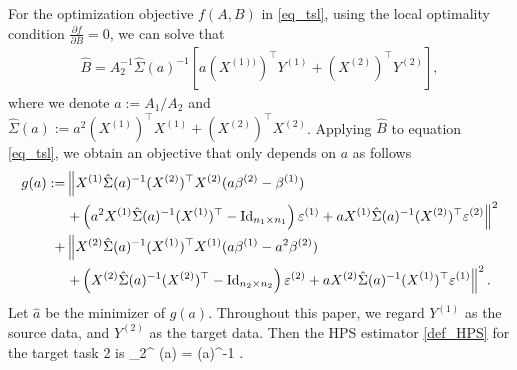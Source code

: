 For the optimization objective $f(A, B)$ in \eqref{eq_tsl}, using the local optimality condition $\frac{\partial f}{\partial B} = 0$, we can solve that
	\begin{align}
		\hat{B} = A_2^{-1} \hat \Sigma(a)^{-1} \left[a (X^{(1))})^{\top}Y^{(1)} +  (X^{(2)})^{\top}Y^{(2)}\right], \label{eq_Bhat_2task} %
	\end{align}
where we denote $a:=A_1/A_2$ and $\hat \Sigma(a):= a^2 (X^{(1)})^\top X^{(1)}  + (X^{(2)})^\top X^{(2)}$.
Applying $\hat B$ to equation \eqref{eq_tsl}, we obtain an objective that only depends on $a $ as follows %
 \begin{align}
		 g(a) \define & \left\| X^{(1)} \hat\Sigma(a)^{-1} (X^{(2)})^\top X^{(2)} (a\beta^{(2)}-\beta^{(1)}) \right. \nonumber\\
			& \left. + \left(a^2 X^{(1)}\hat \Sigma(a)^{-1} (X^{(1)})^\top-\id_{n_1\times n_1}\right)\epsilon^{(1)}+ a X^{(1)}\hat \Sigma(a)^{-1} (X^{(2)})^\top \epsilon^{(2)} \right\|^2 \nonumber\\
		   +& \left\| X^{(2)} \hat \Sigma(a)^{-1} (X^{(1)})^\top X^{(1)} (a\beta^{(1)}-a^2\beta^{(2)}) \right. \nonumber\\
		  &\left.+ \left(X^{(2)}\hat\Sigma(a)^{-1} (X^{(2)})^\top-\id_{n_2\times n_2}\right)\epsilon^{(2)} + a X^{(2)}\hat \Sigma(a)^{-1} (X^{(1)})^\top \epsilon^{(1)} \right\|^2. \label{eq_mtl_A12}
	\end{align}
Let $\hat a$ be the minimizer of $g(a)$. Throughout this paper, we regard $Y^{(1)}$ as the source data, and $Y^{(2)}$ as the target data.  Then the HPS estimator \eqref{def_HPS} for the target task 2 is
\be\label{HPS_est}
\hat{\beta}_2^{\MTL} (\hat a) = \hat \Sigma(\hat a)^{-1}  .
\ee
\fi
